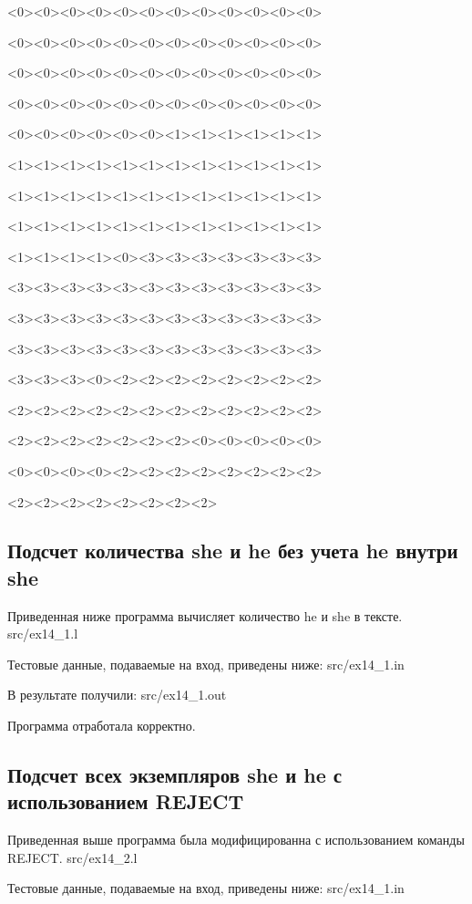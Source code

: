     <0><0><0><0><0><0><0><0><0><0><0><0>

    <0><0><0><0><0><0><0><0><0><0><0><0>

    <0><0><0><0><0><0><0><0><0><0><0><0>

    <0><0><0><0><0><0><0><0><0><0><0><0>

    <0><0><0><0><0><0><1><1><1><1><1><1>

    <1><1><1><1><1><1><1><1><1><1><1><1>

    <1><1><1><1><1><1><1><1><1><1><1><1>

    <1><1><1><1><1><1><1><1><1><1><1><1>

    <1><1><1><1><0><3><3><3><3><3><3><3>

    <3><3><3><3><3><3><3><3><3><3><3><3>

    <3><3><3><3><3><3><3><3><3><3><3><3>

    <3><3><3><3><3><3><3><3><3><3><3><3>

    <3><3><3><0><2><2><2><2><2><2><2><2>

    <2><2><2><2><2><2><2><2><2><2><2><2>

    <2><2><2><2><2><2><2><0><0><0><0><0>

    <0><0><0><0><2><2><2><2><2><2><2><2>

    <2><2><2><2><2><2><2><2>
    
\subsection{Подсчет количества she и he без учета he внутри she}

    Приведенная ниже программа вычисляет количество he и she в тексте.
     {src/ex14_1.l}

    Тестовые данные, подаваемые на вход, приведены ниже:
     {src/ex14_1.in}
    
    В результате получили:
     {src/ex14_1.out}

    Программа отработала корректно.

\subsection{Подсчет всех экземпляров she и he с использованием REJECT}

    Приведенная выше программа была модифицированна с использованием команды REJECT.
     {src/ex14_2.l}

    Тестовые данные, подаваемые на вход, приведены ниже:
     {src/ex14_1.in}
    
